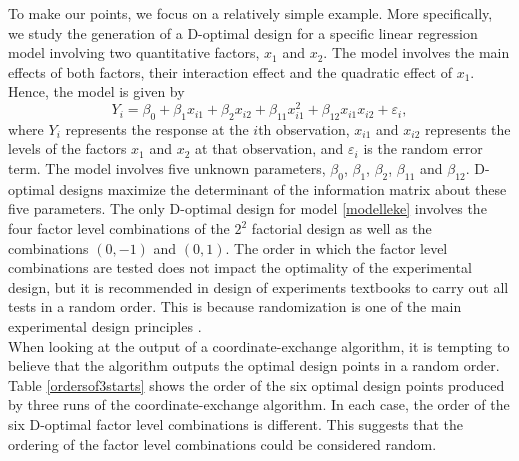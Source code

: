 To make our points, we focus on a relatively simple example. More specifically, we study the generation of a D-optimal design for a specific linear regression model involving two quantitative factors, $x_1$ and $x_2$. The model involves the main effects of both factors, their interaction effect and the quadratic effect of $x_1$. Hence, the model is given by
\begin{equation}\label{modelleke}
Y_i = \beta_0 + \beta_1x_{i1} + \beta_2x_{i2} + \beta_{11}x_{i1}^2 + \beta_{12}x_{i1}x_{i2} + \varepsilon_i,
\end{equation}
where $Y_i$ represents the response at the $i$th observation, $x_{i1}$ and $x_{i2}$ represents the levels of the factors $x_1$ and $x_2$ at that observation, and $\varepsilon_i$ is the random error term. The model involves five unknown parameters, $\beta_0$, $\beta_1$, $\beta_2$, $\beta_{11}$ and $\beta_{12}$. D-optimal designs maximize the determinant of the information matrix about these five parameters. The only D-optimal design for model \eqref{modelleke} involves the four factor level combinations of the $2^2$ factorial design as well as the combinations $(0,-1)$ and $(0,1)$. The order in which the factor level combinations are tested does not impact the optimality of the experimental design, but it is recommended in design of experiments textbooks to carry out all tests in a random order. This is because randomization is one of the main experimental design principles \citep{mont}.\\

When looking at the output of a coordinate-exchange algorithm, it is tempting to believe that the algorithm outputs the optimal design points in a random order. Table \ref{ordersof3starts} shows the order of the six optimal design points produced by three runs of the coordinate-exchange algorithm. In each case, the order of the six D-optimal factor level combinations is different. This suggests that the ordering of the factor level combinations could be considered random.\\

